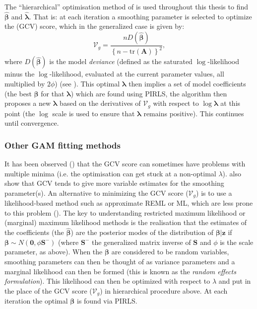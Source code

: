 The ``hierarchical'' optimisation method of  is used throughout this thesis to find $\bm{\hat{\beta}}$ and $\bm{\hat{\lambda}}$. That is: at each iteration a smoothing parameter is selected to optimize the (GCV) score, which in the generalized case is given by:
\begin{equation*}
\mathcal{V}_g = \frac{n D(\bm{\hat{\beta}})}{\left \{n-\text{tr}(\mathbf{A}) \right \}^2},
\end{equation*}
where $D(\bm{\hat{\beta}})$ is the model \textit{deviance} (defined as the saturated $\log$-likelihood minus the $\log$-likelihood, evaluated at the current parameter values, all multiplied by $2\phi$) (see \cite[p. 178]{simonbook}). This optimal $\bm{\lambda}$ then implies a set of model coefficients (the best $\bm{\beta}$ for that $\bm{\lambda}$) which are found using PIRLS, the algorithm then proposes a new $\bm{\lambda}$ based on the derivatives of $\mathcal{V}_g$ with respect to $\log \bm{\lambda}$ at this point (the $\log$ scale is used to ensure that $\bm{\lambda}$ remains positive). This continues until convergence.

\subsubsection{Other GAM fitting methods}
\label{intro-otherGAMfit}

It has been observed (\cite{reissogden}) that the GCV score can sometimes have problems with multiple minima (i.e. the optimisation can get stuck at a non-optimal $\lambda$).  also show that GCV tends to give more variable estimates for the smoothing parameter(s). An alternative to minimizing the GCV score ($\mathcal{V}_g$) is to use a likelihood-based method such as approximate REML or ML, which are less prone to this problem (\cite{remlpaper}). The key to understanding restricted maximum likelihood or (marginal) maximum likelihood methods is the realisation that the estimates of the coefficients (the $\bm{\hat{\beta}}$) are the posterior modes of the distribution of $\bm{\beta}|\mathbf{z}$ if $\bm{\beta} \sim N(\mathbf{0}, \phi \mathbf{S}^-)$ (where $\mathbf{S}^-$ the generalized matrix inverse of $\mathbf{S}$ and $\phi$ is the scale parameter, as above). When the $\bm{\beta}$ are considered to be random variables, smoothing parameters can then be thought of as variance parameters and a marginal likelihood can then be formed (this is known as the \textit{random effects formulation}).  This likelihood can then be optimized with respect to $\lambda$ and put in the place of the GCV score ($\mathcal{V}_g$) in hierarchical procedure above. At each iteration the optimal $\bm{\beta}$ is found via PIRLS.

